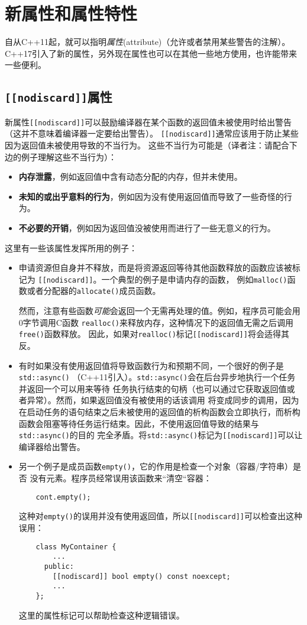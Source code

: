 \section{新属性和属性特性}\label{ch7}
自从C++11起，就可以指明\emph{属性}(attribute)（允许或者禁用某些警告的注解）。
C++17引入了新的属性，另外现在属性也可以在其他一些地方使用，也许能带来一些便利。

\subsection{\texttt{[[nodiscard]]}属性}
新属性\texttt{[[nodiscard]]}可以鼓励编译器在某个函数的返回值未被使用时给出警告
（这并不意味着编译器一定要给出警告）。
\texttt{[[nodiscard]]}通常应该用于防止某些因为返回值未被使用导致的不当行为。
这些不当行为可能是（译者注：请配合下边的例子理解这些不当行为）：
\begin{itemize}[leftmargin=*]
    \item \textbf{内存泄露}，例如返回值中含有动态分配的内存，但并未使用。
    \item \textbf{未知的或出乎意料的行为}，例如因为没有使用返回值而导致了一些奇怪的行为。
    \item \textbf{不必要的开销}，例如因为返回值没被使用而进行了一些无意义的行为。
\end{itemize}
这里有一些该属性发挥所用的例子：
\begin{itemize}[leftmargin=*]
    \item 申请资源但自身并不释放，而是将资源返回等待其他函数释放的函数应该被标记为
    \texttt{[[nodiscard]]}。一个典型的例子是申请内存的函数，
    例如\texttt{malloc()}函数或者分配器的\texttt{allocate()}成员函数。

    然而，注意有些函数\emph{可能}会返回一个无需再处理的值。例如，程序员可能会用0字节调用C函数
    \texttt{realloc()}来释放内存，这种情况下的返回值无需之后调用\texttt{free()}函数释放。
    因此，如果对\texttt{realloc()}标记\texttt{[[nodiscard]]}将会适得其反。
    \item 有时如果没有使用返回值将导致函数行为和预期不同，一个很好的例子是\texttt{std::async()}
    （C++11引入）。\texttt{std::async()}会在后台异步地执行一个任务并返回一个可以用来等待
    任务执行结束的句柄（也可以通过它获取返回值或者异常）。然而，如果返回值没有被使用的话该调用
    将变成同步的调用，因为在启动任务的语句结束之后未被使用的返回值的析构函数会立即执行，而析构
    函数会阻塞等待任务运行结束。因此，不使用返回值导致的结果与\texttt{std::async()}的目的
    完全矛盾。将\texttt{std::async()}标记为\texttt{[[nodiscard]]}可以让编译器给出警告。
    \item 另一个例子是成员函数\texttt{empty()}，它的作用是检查一个对象（容器/字符串）是否
    没有元素。程序员经常误用该函数来“清空“容器：
    \begin{lstlisting}
    cont.empty();
    \end{lstlisting}
    这种对\texttt{empty()}的误用并没有使用返回值，所以\texttt{[[nodiscard]]}可以检查出这种误用：
    \begin{lstlisting}
    class MyContainer {
        ...
      public:
        [[nodiscard]] bool empty() const noexcept;
        ...
    };
    \end{lstlisting}
    这里的属性标记可以帮助检查这种逻辑错误。
\end{itemize}

